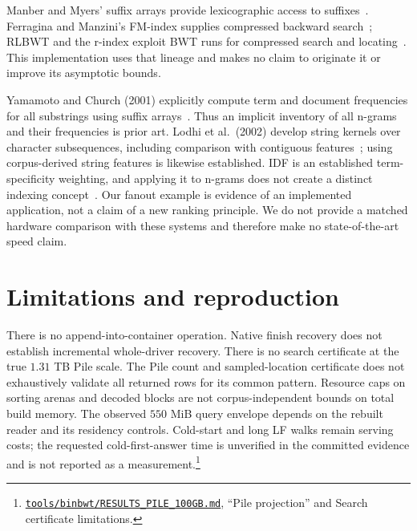 \documentclass[10pt]{article}
\newcommand{\qnum}[2]{#2}
\newcommand{\ev}[2]{\footnote{\href{https://github.com/pangenome/sxgc/blob/c46a85217b9b269c91179cbebc396f96453181af/#1}{\nolinkurl{#1}}, #2.}}
\begin{document}
Manber and Myers' suffix arrays provide lexicographic access to suffixes~\cite{sa}. Ferragina and
Manzini's FM-index supplies compressed backward search~\cite{fm}; RLBWT and the r-index exploit BWT
runs for compressed search and locating~\cite{rindex}. This implementation uses that lineage and
makes no claim to originate it or improve its asymptotic bounds.

Yamamoto and Church (\qnum{ycdate}{2001}) explicitly compute term and document frequencies for all
substrings using suffix arrays~\cite{yc}. Thus an implicit inventory of all n-grams and their
frequencies is prior art. Lodhi et al.\ (\qnum{lodhidate}{2002}) develop string kernels over
character subsequences, including comparison with contiguous features~\cite{lodhi}; using
corpus-derived string features is likewise established. IDF is an established term-specificity
weighting, and applying it to n-grams does not create a distinct indexing concept~\cite{idf,yc}. Our
fanout example is evidence of an implemented application, not a claim of a new ranking principle. We
do not provide a matched hardware comparison with these systems and therefore make no
state-of-the-art speed claim.

\section{Limitations and reproduction}
There is no append-into-container operation. Native finish recovery does not establish incremental
whole-driver recovery. There is no search certificate at the true $\qnum{fullpile}{1.31}$ TB Pile
scale. The Pile count and sampled-location certificate does not exhaustively validate all returned
rows for its common pattern. Resource caps on sorting arenas and decoded blocks are not
corpus-independent bounds on total build memory. The observed $\qnum{rsscap}{550}$ MiB query
envelope depends on the rebuilt reader and its residency controls. Cold-start and long LF walks
remain serving costs; the requested cold-first-answer time is unverified in the committed evidence
and is not reported as a measurement.\ev{tools/binbwt/RESULTS_PILE_100GB.md}{``Pile projection'' and
Search certificate limitations}
\end{document}
